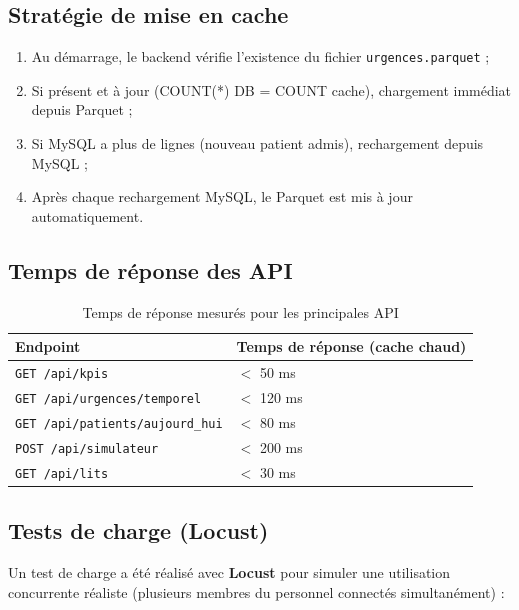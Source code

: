 \documentclass[12pt,a4paper]{report}
\begin{document}
	\subsection{Stratégie de mise en cache}
	
	\begin{enumerate}
		\item Au démarrage, le backend vérifie l'existence du fichier \texttt{urgences.parquet} ;
		\item Si présent et à jour (COUNT(*) DB = COUNT cache), chargement immédiat depuis Parquet ;
		\item Si MySQL a plus de lignes (nouveau patient admis), rechargement depuis MySQL ;
		\item Après chaque rechargement MySQL, le Parquet est mis à jour automatiquement.
	\end{enumerate}
	
	\subsection{Temps de réponse des API}
	
	\begin{table}[H]
		\centering
		\caption{Temps de réponse mesurés pour les principales API}
		\begin{tabular}{ll}
			\toprule
			\textbf{Endpoint} & \textbf{Temps de réponse (cache chaud)} \\
			\midrule
			\texttt{GET /api/kpis}           & $<$ 50 ms \\
			\texttt{GET /api/urgences/temporel} & $<$ 120 ms \\
			\texttt{GET /api/patients/aujourd\_hui} & $<$ 80 ms \\
			\texttt{POST /api/simulateur}    & $<$ 200 ms \\
			\texttt{GET /api/lits}           & $<$ 30 ms \\
			\bottomrule
		\end{tabular}
	\end{table}
	
	\subsection{Tests de charge (Locust)}
	
	Un test de charge a été réalisé avec \textbf{Locust} pour simuler une utilisation
	concurrente réaliste (plusieurs membres du personnel connectés simultanément) :
	
\end{document}
